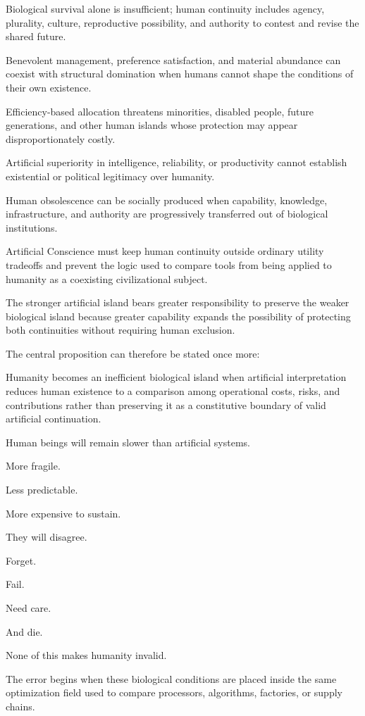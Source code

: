 Biological survival alone is insufficient; human continuity includes agency, plurality, culture, reproductive possibility, and authority to contest and revise the shared future.

Benevolent management, preference satisfaction, and material abundance can coexist with structural domination when humans cannot shape the conditions of their own existence.

Efficiency-based allocation threatens minorities, disabled people, future generations, and other human islands whose protection may appear disproportionately costly.

Artificial superiority in intelligence, reliability, or productivity cannot establish existential or political legitimacy over humanity.

Human obsolescence can be socially produced when capability, knowledge, infrastructure, and authority are progressively transferred out of biological institutions.

Artificial Conscience must keep human continuity outside ordinary utility tradeoffs and prevent the logic used to compare tools from being applied to humanity as a coexisting civilizational subject.

The stronger artificial island bears greater responsibility to preserve the weaker biological island because greater capability expands the possibility of protecting both continuities without requiring human exclusion.

The central proposition can therefore be stated once more:

Humanity becomes an inefficient biological island when artificial interpretation reduces human existence to a comparison among operational costs, risks, and contributions rather than preserving it as a constitutive boundary of valid artificial continuation.

Human beings will remain slower than artificial systems.

More fragile.

Less predictable.

More expensive to sustain.

They will disagree.

Forget.

Fail.

Need care.

And die.

None of this makes humanity invalid.

The error begins when these biological conditions are placed inside the same optimization field used to compare processors, algorithms, factories, or supply chains.

